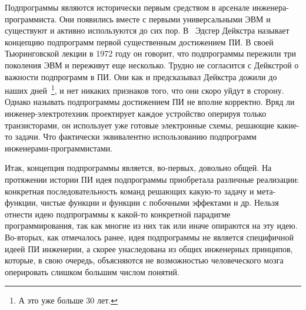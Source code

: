 Подпрограммы являются исторически первым средством в арсенале инженера-программиста. Они появились вместе с первыми универсальными ЭВМ и существуют и активно используются до сих пор. В~\cite{Dijkstra:1972:HP} Эдсгер Дейкстра называет концепцию подпрограмм первой существенным достижением ПИ. В своей Тьюринговской лекции в 1972 году он говорит, что подпрограммы пережили три поколения ЭВМ и переживут еще несколько. Трудно не согласится с Дейкстрой о важности подпрограмм в ПИ. Они как и предсказывал Дейкстра дожили до наших дней~\footnote{А это уже больше 30 лет.}, и нет никаких признаков того, что они скоро уйдут в сторону. Однако называть подпрограммы достижением ПИ не вполне корректно. Вряд ли инженер-электротехник проектирует каждое устройство оперируя только транзисторами, он использует уже готовые электронные схемы, решающие какие-то задачи. Что фактически эквивалентно использованию подпрограмм инженерами-программистами.

Итак, концепция подпрограммы является, во-первых, довольно общей. На протяжении истории ПИ идея подпрограммы приобретала различные реализации: конкретная последовательность команд решающих какую-то задачу и мета-функции, чистые функции и функции с побочными эффектами и др. Нельзя отнести идею подпрограммы к какой-то конкретной парадигме программирования, так как многие из них так или иначе опираются на эту идею. Во-вторых, как отмечалось ранее, идея подпрограммы не является специфичной идеей ПИ инженерии, а скорее унаследована из общих инженерных принципов, которые, в свою очередь, объясняются не возможностью человеческого мозга оперировать слишком большим числом понятий.
